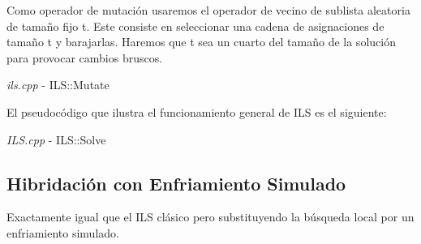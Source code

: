 \documentclass[a4paper, 12pt]{article}
\begin{document}
     	Como operador de mutación usaremos el operador de vecino de sublista aleatoria de tamaño fijo t. Este consiste en seleccionar una cadena de asignaciones de tamaño t y barajarlas. Haremos que t sea un cuarto del tamaño de la solución para provocar cambios bruscos.\\
     	\begin{algorithm}[H]
       	\caption{\textit{ils.cpp} - ILS::Mutate}
       	
      \end{algorithm}
      
      El pseudocódigo que ilustra el funcionamiento general de ILS es el siguiente:\\
      \begin{algorithm}[H]
       	\caption{\textit{ILS.cpp} - ILS::Solve}
       	
      \end{algorithm}
      
     	
     	\subsection{Hibridación con Enfriamiento Simulado}
     	Exactamente igual que el ILS clásico pero substituyendo la búsqueda local por un enfriamiento simulado.
      
\end{document}
